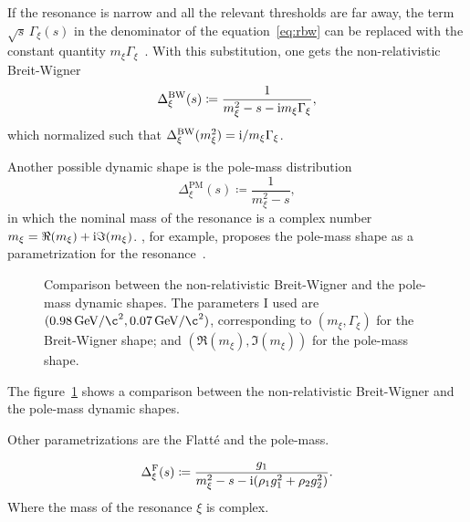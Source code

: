     If the resonance is narrow and all the relevant thresholds are far away, the term $\sqrt{s}\,\Gamma_\xi(s)$ in the denominator of the equation~\eqref{eq:rbw} can be replaced with the constant quantity $m_{\xi}\Gamma_{\xi}$~\cite[\S~47.2.1]{chinese_phisics}.
    With this substitution, one gets the non-relativistic Breit-Wigner
    \begin{equation}\label{eq:bw}
        \Delta_{\xi}^{\text{BW}}(s) \coloneqq \frac{1}{m_{\xi}^2 - s - \mathrm{i} m_{\xi} \Gamma_{\xi}},
    \end{equation}
    which normalized such that $\Delta_{\xi}^{\text{BW}}(m_{\xi}^2) = \mathrm{i} / m_\xi\Gamma_\xi$.


    Another possible dynamic shape is the pole-mass distribution
    \begin{equation}\label{eq:pole_mass}
        \Delta_{\xi}^{\text{PM}}(s) \coloneqq \frac{1}{m_{\xi}^2 - s},
    \end{equation}
    in which the nominal mass of the resonance is a complex number $m_\xi = \Re (m_\xi) + \mathrm{i}\Im(m_\xi)$.
    \citeauthor{PhysRevD.71.054030}, for example, proposes the pole-mass shape as a parametrization for the \Psigma{} resonance~\cite{PhysRevD.71.054030}.
    \begin{figure}
        \centering
        
        \caption{Comparison between the non-relativistic Breit-Wigner and the pole-mass dynamic shapes. The parameters I used are $(\SI{.98}{\giga\electronvolt/\c^2}, \SI{.07}{\giga\electronvolt/\c^2})$, corresponding to $(m_\xi,\Gamma_\xi)$ for the Breit-Wigner shape; and $(\Re(m_\xi),\Im(m_\xi))$ for the pole-mass shape.}

        \label{fig:bw_pm_comparison}
    \end{figure}
    The figure~\ref{fig:bw_pm_comparison} shows a comparison between the non-relativistic Breit-Wigner and the pole-mass dynamic shapes.

    {\color{red} Other parametrizations are the Flatté and the pole-mass.

    \begin{equation}\label{eq:flatte}
        \Delta_{\xi}^{\text{F}}(s) \coloneqq \frac{g_1}{m_{\xi}^2 - s - \mathrm{i}(\rho_1 g_1^2 + \rho_2 g_2^2)}.
    \end{equation}
    Where the mass of the resonance $\xi$ is complex.
    }

